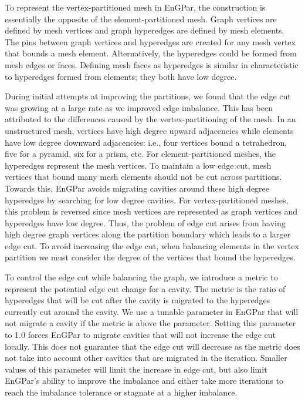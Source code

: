 \documentclass[conference]{IEEEtran}
\begin{document}
To represent the vertex-partitioned mesh in EnGPar, the construction
is essentially the opposite of the element-partitioned mesh. Graph
vertices are defined by mesh vertices and graph hyperedges are defined
by mesh elements. The pins between graph vertices and hyperedges are
created for any mesh vertex that bounds a mesh element.
Alternatively, the hyperedges could be formed from mesh edges or faces.
Defining mesh faces as hyperedges is similar in characteristic to hyperedges
formed from elements; they both have low degree.

During initial attempts at improving the partitions, we found that the edge cut was growing
at a large rate as we improved edge imbalance. This has been attributed to the differences
caused by the vertex-partitioning of the mesh. In an unstructured mesh, vertices have
high degree upward adjacencies while elements have low degree downward
adjacencies: i.e., four vertices bound a tetrahedron, five for a pyramid, six
for a prism, etc. For element-partitioned meshes, the hyperedges
represent the mesh vertices. To maintain a low edge cut, mesh vertices that bound many mesh
elements should not be cut across partitions. Towards this, EnGPar avoids migrating cavities
around these high degree hyperedges by searching for low degree cavities. For vertex-partitioned
meshes, this problem is reversed since mesh vertices are represented as graph vertices
and hyperedges have low degree.
Thus, the problem of edge cut arises from having high degree graph vertices along the partition
boundary which leads to a larger edge cut. To avoid increasing the edge cut, when balancing
elements in the vertex partition we must consider the degree of the vertices that bound the
hyperedges.

To control the edge cut while balancing the graph, we introduce a metric to represent the
potential edge cut change for a cavity. The metric is the ratio of hyperedges that will be cut
after the cavity is migrated to the hyperedges currently cut around the cavity. We use a tunable
parameter in EnGPar that will not migrate a cavity if the metric is above the parameter.
Setting this parameter to 1.0 forces EnGPar to migrate cavities that will not increase the edge
cut locally. This does not guarantee that the edge cut will decrease as the metric does not take
into account other cavities that are migrated in the iteration. Smaller values of this
parameter will limit the increase in edge cut, but also limit EnGPar's ability to improve the
imbalance and either take more iterations to reach the imbalance tolerance or stagnate at a
higher imbalance.
\end{document}

